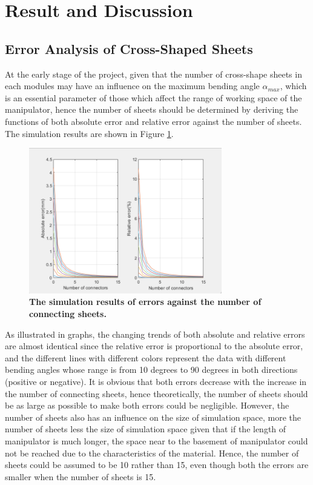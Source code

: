 \section{Result and Discussion} 
\subsection{Error Analysis of Cross-Shaped Sheets}
At the early stage of the project, given that the number of cross-shape sheets in each modules may have an 
influence on the maximum bending angle $\alpha_{max}$, which is an essential parameter of those which affect 
the range of working space of the manipulator, hence the number of sheets should be determined by deriving the 
functions of both absolute error and relative error \cite{fishboneCR} against the number of sheets. The simulation 
results are shown in Figure \ref{fig:error_analysis}.
\begin{figure}[H] %
    \centering %
    \captionsetup{labelsep=colon}
    \includegraphics[width=0.75\textwidth]{Image/Result/error_analysis.png} 
    \caption[The simulation results of errors against the number of connecting sheets]
    {\centering \textbf{The simulation results of errors against the number of connecting sheets.}}
    \label{fig:error_analysis}
\end{figure}
As illustrated in graphs, the changing trends of both absolute and relative errors are almost identical since 
the relative error is proportional to the absolute error, and the different lines with different colors represent 
the data with different bending angles whose range is from 10 degrees to 90 degrees in both directions (positive 
or negative). It is obvious that both errors decrease with the increase in the number of connecting sheets, hence 
theoretically, the number of sheets should be as large as possible to make both errors could be negligible. However, 
the number of sheets also has an influence on the size of simulation space, more the number of sheets less the size 
of simulation space given that if the length of manipulator is much longer, the space near to the basement of 
manipulator could not be reached due to the characteristics of the material. Hence, the number of sheets could be 
assumed to be 10 rather than 15, even though both the errors are smaller when the number of sheets is 15. \\
